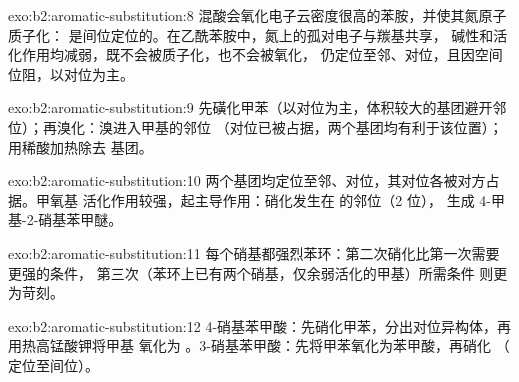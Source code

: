 \begin{solution}{exo:b2:aromatic-substitution:8}
混酸会氧化电子云密度很高的苯胺，并使其氮原子质子化：
是间位定位的。在乙酰苯胺中，氮上的孤对电子与羰基共享，
碱性和活化作用均减弱，既不会被质子化，也不会被氧化，
仍定位至邻、对位，且因空间位阻，以对位为主。
\end{solution}

\begin{solution}{exo:b2:aromatic-substitution:9}
先磺化甲苯（以对位为主，体积较大的基团避开邻位）；再溴化：溴进入甲基的邻位
（对位已被占据，两个基团均有利于该位置）；
用稀酸加热除去  基团。
\end{solution}

\begin{solution}{exo:b2:aromatic-substitution:10}
两个基团均定位至邻、对位，其对位各被对方占据。甲氧基
活化作用较强，起主导作用：硝化发生在  的邻位（2 位），
生成 4-甲基-2-硝基苯甲醚。
\end{solution}

\begin{solution}{exo:b2:aromatic-substitution:11}
每个硝基都强烈苯环：第二次硝化比第一次需要更强的条件，
第三次（苯环上已有两个硝基，仅余弱活化的甲基）所需条件
则更为苛刻。
\end{solution}

\begin{solution}{exo:b2:aromatic-substitution:12}
4-硝基苯甲酸：先硝化甲苯，分出对位异构体，再用热高锰酸钾将甲基
氧化为 。3-硝基苯甲酸：先将甲苯氧化为苯甲酸，再硝化
（ 定位至间位）。
\end{solution}

